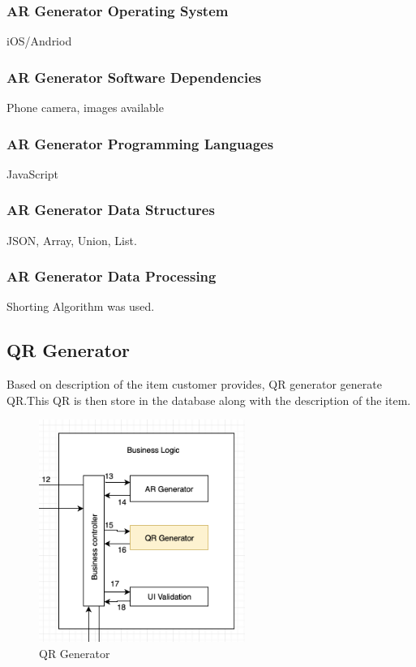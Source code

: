 \subsubsection{AR Generator Operating System}
iOS/Andriod

\subsubsection{AR Generator Software Dependencies}
Phone camera, images available

\subsubsection{AR Generator Programming Languages}
JavaScript

\subsubsection{AR Generator Data Structures}
JSON, Array, Union, List.

\subsubsection{AR Generator Data Processing}
Shorting Algorithm was used.


\subsection{QR Generator}
Based on description of the item customer provides, QR generator generate QR.This QR is then store in the database along with the  description of the item.

\begin{figure}[h!]
	\centering
 	\includegraphics[width=0.60\textwidth]{images/qrgenerator}
 \caption{QR Generator}
\end{figure}

